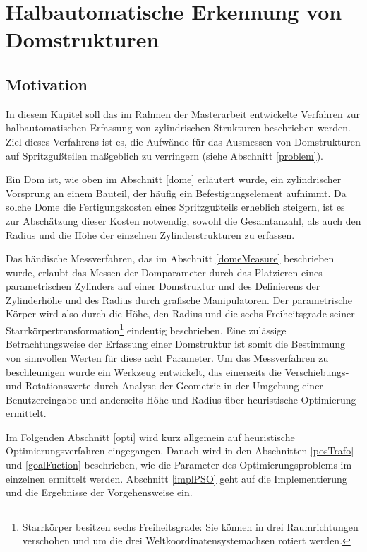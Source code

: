 \chapter{Halbautomatische Erkennung von Domstrukturen}
\label{cha:psoDomes}	
	

\section{Motivation}

In diesem Kapitel soll das im Rahmen der Masterarbeit entwickelte Verfahren zur halbautomatischen Erfassung 
von zylindrischen Strukturen beschrieben werden. Ziel dieses Verfahrens ist es, die Aufw\"ande f\"ur das Ausmessen von Domstrukturen auf Spritzgu{\ss}teilen ma{\ss}geblich zu verringern (siehe Abschnitt \ref{problem}). 

Ein Dom ist, wie oben im Abschnitt \ref{dome} erl\"autert wurde, ein zylindrischer Vorsprung an einem Bauteil, der h\"aufig ein Befestigungselement aufnimmt. Da solche Dome die Fertigungskosten eines Spritzgu{\ss}teils erheblich steigern, ist es zur Absch\"atzung dieser Kosten notwendig, sowohl die Gesamtanzahl, als auch den Radius und die H\"ohe der einzelnen Zylinderstrukturen zu erfassen.

Das h\"andische Messverfahren, das im Abschnitt \ref{domeMeasure} beschrieben wurde, erlaubt das Messen der Domparameter durch das Platzieren eines parametrischen Zylinders auf einer Domstruktur und des Definierens der Zylinderh\"ohe und des Radius durch grafische Manipulatoren. 
Der parametrische K\"orper wird also durch die H\"ohe, den Radius und die sechs Freiheitsgrade seiner Starrk\"orpertransformation\footnote{Starrkörper besitzen sechs Freiheitsgrade: Sie können in drei Raumrichtungen
verschoben und um die drei Weltkoordinatensystemachsen rotiert werden.} eindeutig beschrieben. Eine zul\"assige Betrachtungsweise der Erfassung einer Domstruktur ist somit die Bestimmung von sinnvollen Werten für diese acht Parameter. Um das Messverfahren zu beschleunigen wurde ein Werkzeug entwickelt, das einerseits die Verschiebungs- und
Rotationswerte durch Analyse der Geometrie in der Umgebung einer Benutzereingabe und anderseits H\"ohe und Radius über heuristische Optimierung ermittelt.

Im Folgenden Abschnitt \ref{opti} wird kurz allgemein auf heuristische Optimierungsverfahren eingegangen. Danach wird in den Abschnitten  \ref{posTrafo} und \ref{goalFuction} beschrieben, wie die Parameter des Optimierungsproblems im einzelnen ermittelt werden. Abschnitt \ref{implPSO} geht auf die Implementierung und die Ergebnisse der Vorgehensweise ein.

